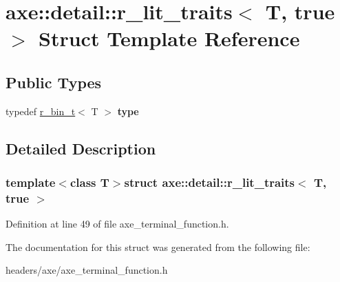 \hypertarget{structaxe_1_1detail_1_1r__lit__traits_3_01T_00_01true_01_4}{\section{axe\+:\+:detail\+:\+:r\+\_\+lit\+\_\+traits$<$ T, true $>$ Struct Template Reference}
\label{structaxe_1_1detail_1_1r__lit__traits_3_01T_00_01true_01_4}
}
\subsection*{Public Types}
\begin{DoxyCompactItemize}
\item 
\hypertarget{structaxe_1_1detail_1_1r__lit__traits_3_01T_00_01true_01_4_affa96e3a9c12facab3d316c073cfdb73}{typedef \hyperlink{classaxe_1_1r__bin__t}{r\+\_\+bin\+\_\+t}$<$ T $>$ {\bfseries type}}\label{structaxe_1_1detail_1_1r__lit__traits_3_01T_00_01true_01_4_affa96e3a9c12facab3d316c073cfdb73}

\end{DoxyCompactItemize}


\subsection{Detailed Description}
\subsubsection*{template$<$class T$>$struct axe\+::detail\+::r\+\_\+lit\+\_\+traits$<$ T, true $>$}



Definition at line 49 of file axe\+\_\+terminal\+\_\+function.\+h.



The documentation for this struct was generated from the following file\+:\begin{DoxyCompactItemize}
\item 
headers/axe/axe\+\_\+terminal\+\_\+function.\+h\end{DoxyCompactItemize}
